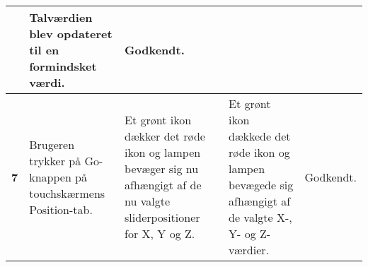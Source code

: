 \begin{center}
\begin{longtable}{|p{}|p{}|p{}|p{}|p{}|}
            & Talværdien blev opdateret til en formindsket værdi.
            & Godkendt. 
        \\ \hline
        \textbf{7} 
            & Brugeren trykker på Go-knappen på touchskærmens Position-tab.
            & Et grønt ikon dækker det røde ikon og lampen bevæger sig nu afhængigt af de nu valgte sliderpositioner for X, Y og Z.
            & Et grønt ikon dækkede det røde ikon og lampen bevægede sig afhængigt af de valgte X-, Y- og Z-værdier.	
            & Godkendt. 
        \\ \hline
	\end{longtable}
	\label{ATUC5}
\end{center}